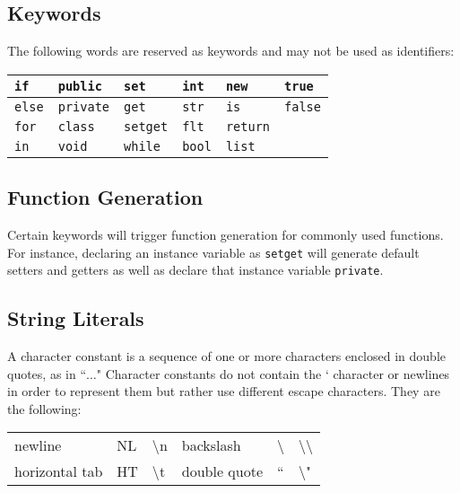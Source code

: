 \documentclass[12pt]{report}
\begin{document}
\subsection{Keywords}

\begin{doublespace}
The following words are reserved as keywords and may not be used as identifiers:
\end{doublespace}

\begin{center}
\begin{onehalfspace}
\begin{tabular}{ | l | l | l | l | l | l | }
\hline
\texttt{if} & \texttt{public} & \texttt{set} & \texttt{int} & \texttt{new} & \texttt{true} \\
\hline
\texttt{else} & \texttt{private} & \texttt{get} & \texttt{str} & \texttt{is} & \texttt{false} \\
\hline
\texttt{for} & \texttt{class} & \texttt{setget} & \texttt{flt} & \texttt{return} & \\
\hline
\texttt{in} & \texttt{void} & \texttt{while} & \texttt{bool} & \texttt{list} & \\
\hline
\end{tabular}
\end{onehalfspace}
\end{center}

\subsection{Function Generation}

\begin{doublespace}
Certain keywords will trigger function generation for commonly used functions. For instance, declaring an instance variable as \texttt{setget} will generate default setters and getters as well as declare that instance variable \texttt{private}.
\end{doublespace}

\subsection{String Literals}

\begin{doublespace}
A character constant is a sequence of one or more characters enclosed in double quotes, as in ``$\ldots$" Character constants do not contain the ` character or newlines in order to represent them but rather use different escape characters. They are the following:
\begin{flushleft}
\begin{tabular}{ l l l l l l }
newline & NL & \textbackslash{n} & backslash & \textbackslash & \textbackslash\textbackslash \\
horizontal tab & HT & \textbackslash{t} & double quote & `` & \textbackslash"
\end{tabular}
\end{flushleft}
\end{doublespace}
\end{document}
